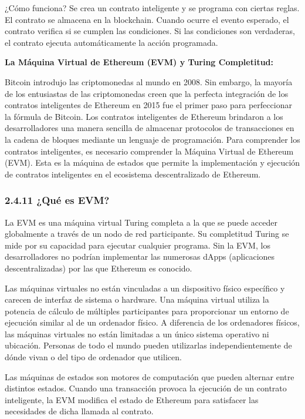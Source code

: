 \documentclass[12pt,a4paper]{article}
\begin{document}
¿Cómo funciona? Se crea un contrato inteligente y se programa con ciertas reglas. El
contrato se almacena en la blockchain. Cuando ocurre el evento esperado, el contrato
verifica si se cumplen las condiciones. Si las condiciones son verdaderas, el contrato
ejecuta automáticamente la acción programada.

\textbf{La Máquina Virtual de Ethereum (EVM) y Turing Completitud:}

Bitcoin introdujo las criptomonedas al mundo en 2008. Sin embargo, la mayoría de los
entusiastas de las criptomonedas creen que la perfecta integración de los contratos
inteligentes de Ethereum en 2015 fue el primer paso para perfeccionar la fórmula de Bitcoin.
Los contratos inteligentes de Ethereum brindaron a los desarrolladores una manera sencilla
de almacenar protocolos de transacciones en la cadena de bloques mediante un lenguaje
de programación. Para comprender los contratos inteligentes, es necesario comprender la
Máquina Virtual de Ethereum (EVM). Esta es la máquina de estados que permite la
implementación y ejecución de contratos inteligentes en el ecosistema descentralizado de
Ethereum.

\subsubsection*{2.4.11 ¿Qué es EVM?}

La EVM es una máquina virtual Turing completa a la que se puede acceder globalmente a
través de un nodo de red participante. Su completitud Turing se mide por su capacidad para
ejecutar cualquier programa. Sin la EVM, los desarrolladores no podrían implementar las
numerosas dApps (aplicaciones descentralizadas) por las que Ethereum es conocido.

Las máquinas virtuales no están vinculadas a un dispositivo físico específico y carecen de
interfaz de sistema o hardware. Una máquina virtual utiliza la potencia de cálculo de
múltiples participantes para proporcionar un entorno de ejecución similar al de un ordenador
físico. A diferencia de los ordenadores físicos, las máquinas virtuales no están limitadas a
un único sistema operativo ni ubicación. Personas de todo el mundo pueden utilizarlas
independientemente de dónde vivan o del tipo de ordenador que utilicen.

Las máquinas de estados son motores de computación que pueden alternar entre distintos
estados. Cuando una transacción provoca la ejecución de un contrato inteligente, la EVM
modifica el estado de Ethereum para satisfacer las necesidades de dicha llamada al
contrato.
\end{document}
